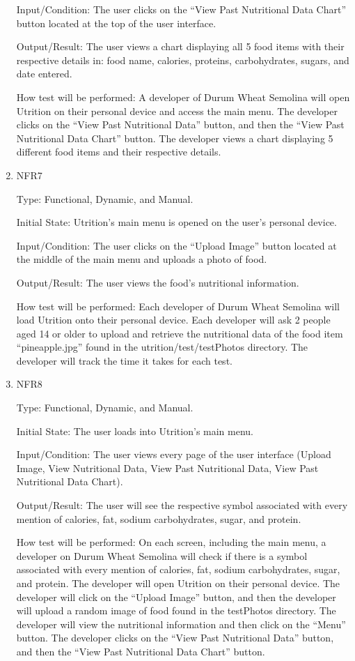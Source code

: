 \documentclass[12pt, titlepage]{article}
\begin{document}
\begin{enumerate}
Input/Condition: The user clicks on the “View Past Nutritional Data Chart” button located at the top of the user interface.

Output/Result: The user views a chart displaying all 5 food items with their respective details in: food name, calories, proteins, carbohydrates, sugars, and date entered.

How test will be performed: A developer of Durum Wheat Semolina will open Utrition on their personal device and access the main menu. The developer clicks on the “View Past Nutritional Data” button, and then the “View Past Nutritional Data Chart” button. The developer views a chart displaying 5 different food items and their respective details.

\item{NFR7\\}

Type: Functional, Dynamic, and Manual.

Initial State: Utrition’s main menu is opened on the user’s personal device.

Input/Condition: The user clicks on the “Upload Image” button located at the middle of the main menu and uploads a photo of food.

Output/Result: The user views the food’s nutritional information.

How test will be performed: Each developer of Durum Wheat Semolina will load Utrition onto their personal device. Each developer will ask 2 people aged 14 or older to upload and retrieve the nutritional data of the food item “pineapple.jpg” found in the utrition/test/testPhotos directory. The developer will track the time it takes for each test.

\item{NFR8\\}

Type: Functional, Dynamic, and Manual.

Initial State: The user loads into Utrition’s main menu.

Input/Condition: The user views every page of the user interface (Upload Image, View Nutritional Data, View Past Nutritional Data, View Past Nutritional Data Chart).

Output/Result: The user will see the respective symbol associated with every mention of calories, fat, sodium carbohydrates, sugar, and protein.

How test will be performed: On each screen, including the main menu, a developer on Durum Wheat Semolina will check if there is a symbol associated with every mention of calories, fat, sodium carbohydrates, sugar, and protein. The developer will open Utrition on their personal device. The developer will click on the “Upload Image” button, and then the developer will upload a random image of food found in the testPhotos directory. The developer will view the nutritional information and then click on the “Menu” button. The developer clicks on the “View Past Nutritional Data” button, and then the “View Past Nutritional Data Chart” button.


\end{enumerate}
\end{document}

